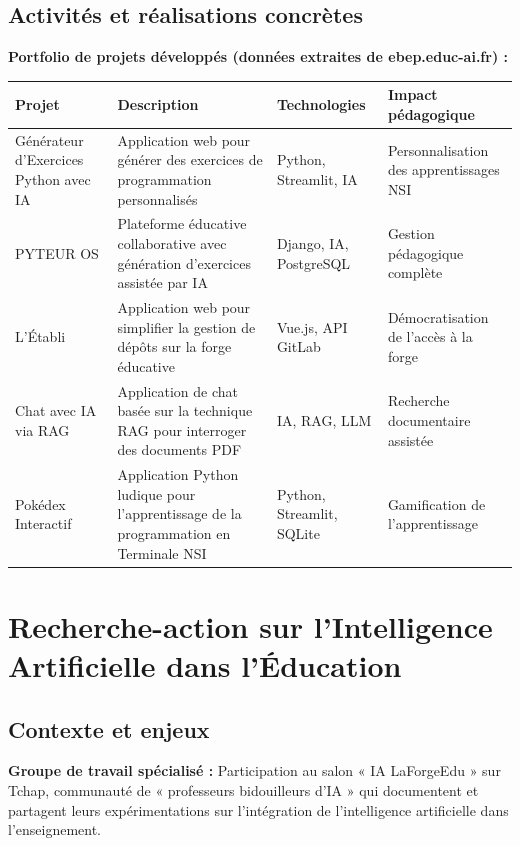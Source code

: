 \subsection{Activités et réalisations concrètes}

\textbf{Portfolio de projets développés (données extraites de ebep.educ-ai.fr) :}

\begin{center}
\footnotesize
\begin{tabular}{|p{3cm}|p{5.5cm}|p{3.5cm}|p{4cm}|}
\hline
\textbf{Projet} & \textbf{Description} & \textbf{Technologies} & \textbf{Impact pédagogique} \\
\hline
Générateur d'Exercices Python avec IA & Application web pour générer des exercices de programmation personnalisés & Python, Streamlit, IA & Personnalisation des apprentissages NSI \\
\hline
PYTEUR OS & Plateforme éducative collaborative avec génération d'exercices assistée par IA & Django, IA, PostgreSQL & Gestion pédagogique complète \\
\hline
L'Établi & Application web pour simplifier la gestion de dépôts sur la forge éducative & Vue.js, API GitLab & Démocratisation de l'accès à la forge \\
\hline
Chat avec IA via RAG & Application de chat basée sur la technique RAG pour interroger des documents PDF & IA, RAG, LLM & Recherche documentaire assistée \\
\hline
Pokédex Interactif & Application Python ludique pour l'apprentissage de la programmation en Terminale NSI & Python, Streamlit, SQLite & Gamification de l'apprentissage \\
\hline
\end{tabular}
\end{center}



\section{Recherche-action sur l'Intelligence Artificielle dans l'Éducation}

\subsection{Contexte et enjeux}

\textbf{Groupe de travail spécialisé :} Participation au salon « IA LaForgeEdu » sur Tchap, communauté de « professeurs bidouilleurs d'IA » qui documentent et partagent leurs expérimentations sur l'intégration de l'intelligence artificielle dans l'enseignement.

